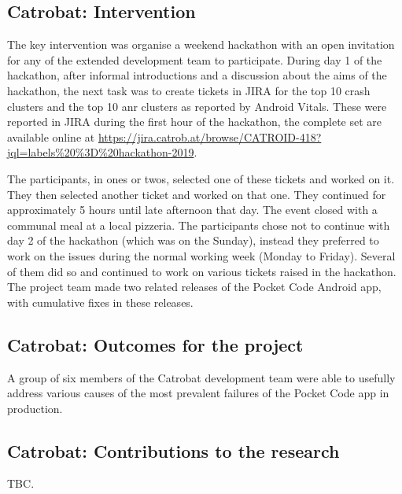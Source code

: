 
\subsection{Catrobat: Intervention}
The key intervention was organise a weekend hackathon with an open invitation for any of the extended development team to participate. During day 1 of the hackathon, after informal introductions and a discussion about the aims of the hackathon, the next task was to create tickets in JIRA for the top 10 crash clusters and the top 10 \acrshort{anr} clusters as reported by Android Vitals. These were reported in JIRA during the first hour of the hackathon, the complete set are available online at \url{https://jira.catrob.at/browse/CATROID-418?jql=labels\%20\%3D\%20hackathon-2019}. 

The participants, in ones or twos, selected one of these tickets and worked on it. They then selected another ticket and worked on that one. They continued for approximately 5 hours until late afternoon that day. The event closed with a communal meal at a local pizzeria. The participants chose not to continue with day 2 of the hackathon (which was on the Sunday), instead they preferred to work on the issues during the normal working week (Monday to Friday). Several of them did so and continued to work on various tickets raised in the hackathon. The project team made two related releases of the Pocket Code Android app, with cumulative fixes in these releases.

\subsection{Catrobat: Outcomes for the project}
A group of six members of the Catrobat development team were able to usefully address various causes of the most prevalent failures of the Pocket Code app in production. 

\subsection{Catrobat: Contributions to the research}
TBC.


\clearpage


